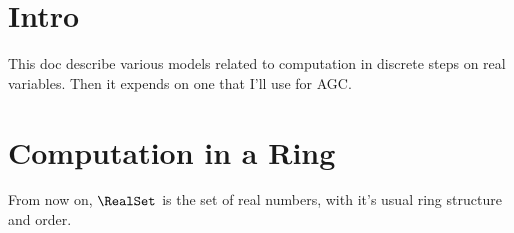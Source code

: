 \section{Intro}

This doc describe various models related to computation in discrete steps on real variables.
Then it expends on one that I'll use for AGC.


\section{Computation in a Ring}

From now on, $\RealSet$ is the set of real numbers, with it's usual ring structure and order.


